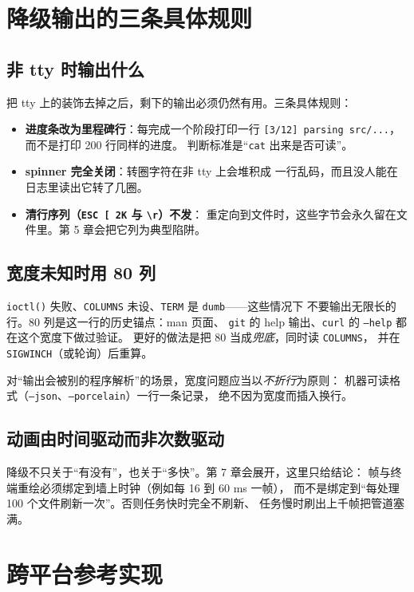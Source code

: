 \documentclass[12pt,a4paper,fontset=fandol]{ctexbook}
\newcommand{\Fn}[1]{\texttt{#1()}}
\newcommand{\Tp}[1]{\texttt{#1}}
\begin{document}
\section{降级输出的三条具体规则}

\subsection{非 tty 时输出什么}

把 tty 上的装饰去掉之后，剩下的输出必须仍然有用。三条具体规则：

\begin{itemize}
\item \textbf{进度条改为里程碑行}：每完成一个阶段打印一行
      \Tp{[3/12] parsing src/...}，而不是打印 200 行同样的进度。
      判断标准是``\Tp{cat} 出来是否可读''。
\item \textbf{spinner 完全关闭}：转圈字符在非 tty 上会堆积成
      一行乱码，而且没人能在日志里读出它转了几圈。
\item \textbf{清行序列（\Tp{ESC [ 2K} 与 \Tp{\textbackslash r}）不发}：
      重定向到文件时，这些字节会永久留在文件里。第 5 章会把它列为典型陷阱。
\end{itemize}

\subsection{宽度未知时用 80 列}

\Fn{ioctl} 失败、\Tp{COLUMNS} 未设、\Tp{TERM} 是 \Tp{dumb}——这些情况下
不要输出无限长的行。80 列是这一行的历史锚点：man 页面、
\Tp{git} 的 help 输出、\Tp{curl} 的 \Tp{--help} 都在这个宽度下做过验证。
更好的做法是把 80 当成\emph{兜底}，同时读 \Tp{COLUMNS}，
并在 \Tp{SIGWINCH}（或轮询）后重算。

对``输出会被别的程序解析''的场景，宽度问题应当以\emph{不折行}为原则：
机器可读格式（\Tp{--json}、\Tp{--porcelain}）一行一条记录，
绝不因为宽度而插入换行。

\subsection{动画由时间驱动而非次数驱动}

降级不只关于``有没有''，也关于``多快''。第 7 章会展开，这里只给结论：
帧与终端重绘必须绑定到墙上时钟（例如每 16 到 60 ms 一帧），
而不是绑定到``每处理 100 个文件刷新一次''。否则任务快时完全不刷新、
任务慢时刷出上千帧把管道塞满。

\section{跨平台参考实现}
\end{document}
